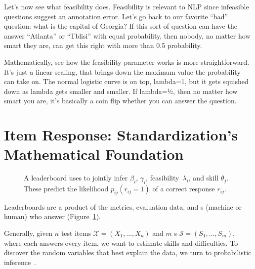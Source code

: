 Let’s now see what feasibility does.  Feasibility is relevant to NLP since
infeasible questions suggest an annotation error. Let’s go back to our
favorite ``bad'' question: what is the capital of Georgia?  If this sort of
question can have the answer ``Atlanta'' or ``Tblisi'' with equal probability,
then nobody, no matter how smart they are, can get this right with more than
0.5 probability.

Mathematically, see how the feasibility parameter works is more
straightforward.  It’s just a linear scaling, that brings down the maximum
value the probability can take on.  The normal logistic curve is on top,
lambda=1, but it gets squished down as lambda gets smaller and smaller.  If
lambda=½, then no matter how smart you are, it’s basically a coin flip whether
you can answer the question.

\section{Item Response: Standardization's Mathematical Foundation}

\begin{figure}[t]
  \centering
  \caption{
    A \name{} leaderboard uses \irt{} to jointly infer \itm{} \diff{} $\beta_i$, \discability{} $\gamma_i$, feasibility~$\lambda_i$, and \subj{} skill $\theta_j$.
    These predict the likelihood $p_{ij}(r_{ij}=1)$ of a correct response $r_{ij}$.
  }
  \label{fig:story}
\end{figure}

Leaderboards are a product of the metrics, evaluation data, and
\subj{}s (machine or human) who answer \itms{}
(Figure~\ref{fig:story}).


Generally, given $n$ test items $\mathcal{X}=(X_1,\ldots,X_n)$
and $m$ \subj{}s
$\mathcal{S}=(S_1,\ldots,S_m)$, where each \subj{} answers every
item, we want to estimate \subj{} skills and \itm{} difficulties.
To discover the random variables that best explain the data, we
turn to probabilistic inference~\cite{pearl-88}.


